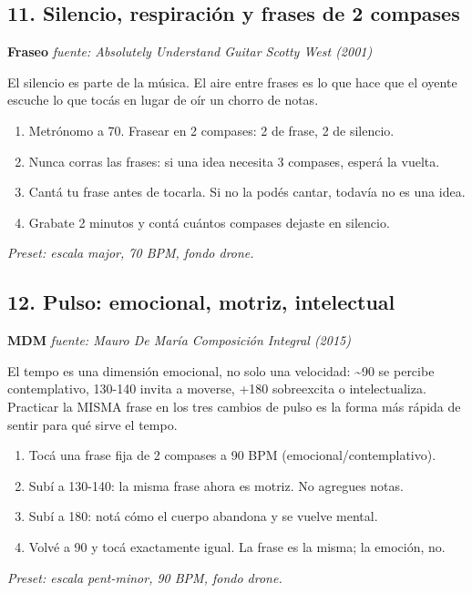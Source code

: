 \documentclass[11pt,a4paper]{article}
\begin{document}
\subsection{11. Silencio, respiración y frases de 2 compases}
\textbf{Fraseo} \hfill \emph{fuente: Absolutely Understand Guitar \textemdash{} Scotty West (2001)}
\par El silencio es parte de la música. El aire entre frases es lo que hace que el oyente escuche lo que tocás en lugar de oír un chorro de notas.
\begin{enumerate}
\item Metrónomo a 70. Frasear en 2 compases: 2 de frase, 2 de silencio.
\item Nunca corras las frases: si una idea necesita 3 compases, esperá la vuelta.
\item Cantá tu frase antes de tocarla. Si no la podés cantar, todavía no es una idea.
\item Grabate 2 minutos y contá cuántos compases dejaste en silencio.
\end{enumerate}
\emph{Preset: escala major, 70 BPM, fondo drone.}
\subsection{12. Pulso: emocional, motriz, intelectual}
\textbf{MDM} \hfill \emph{fuente: Mauro De María \textemdash{} Composición Integral (2015)}
\par El tempo es una dimensión emocional, no solo una velocidad: \textasciitilde{}90 se percibe contemplativo, 130-140 invita a moverse, +180 sobreexcita o intelectualiza. Practicar la MISMA frase en los tres cambios de pulso es la forma más rápida de sentir para qué sirve el tempo.
\begin{enumerate}
\item Tocá una frase fija de 2 compases a 90 BPM (emocional/contemplativo).
\item Subí a 130-140: la misma frase ahora es motriz. No agregues notas.
\item Subí a 180: notá cómo el cuerpo abandona y se vuelve mental.
\item Volvé a 90 y tocá exactamente igual. La frase es la misma; la emoción, no.
\end{enumerate}
\emph{Preset: escala pent-minor, 90 BPM, fondo drone.}
\end{document}
